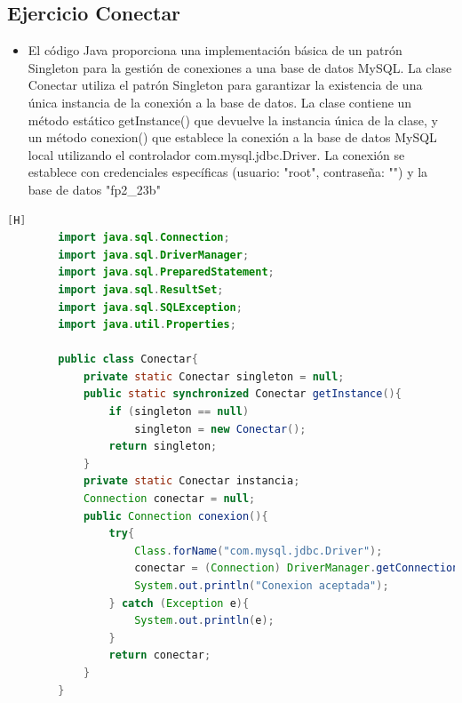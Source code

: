 \documentclass{article}
\begin{document}
	\subsection{Ejercicio Conectar}
	\begin{itemize}	
		\item El código Java proporciona una implementación básica de un patrón Singleton para la gestión de conexiones a una base de datos MySQL. La clase Conectar utiliza el patrón Singleton para garantizar la existencia de una única instancia de la conexión a la base de datos. La clase contiene un método estático getInstance() que devuelve la instancia única de la clase, y un método conexion() que establece la conexión a la base de datos MySQL local utilizando el controlador com.mysql.jdbc.Driver. La conexión se establece con credenciales específicas (usuario: "root", contraseña: "") y la base de datos "fp2_23b"
	\end{itemize}		
	\begin{lstlisting}[language=java,caption={Las lineas de codigos del metodo creado:}][H]
		import java.sql.Connection;
		import java.sql.DriverManager;
		import java.sql.PreparedStatement;
		import java.sql.ResultSet;
		import java.sql.SQLException;
		import java.util.Properties;
		
		public class Conectar{
			private static Conectar singleton = null;
			public static synchronized Conectar getInstance(){
				if (singleton == null)
					singleton = new Conectar();
				return singleton;
			}
			private static Conectar instancia;
			Connection conectar = null;
			public Connection conexion(){
				try{
					Class.forName("com.mysql.jdbc.Driver");
					conectar = (Connection) DriverManager.getConnection("jdbc:mysql://localhost:3306/fp2_23b","root","");
					System.out.println("Conexion aceptada");
				} catch (Exception e){
					System.out.println(e);
				}
				return conectar;
			}
		}
	\end{lstlisting}
\end{document}
